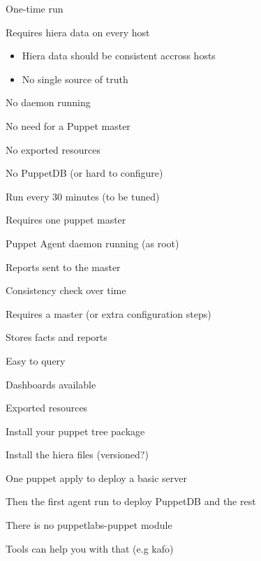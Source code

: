 \begin{iframe}
\item One-time run
\item Requires hiera data on every host
\begin{itemize}
    \item Hiera data should be consistent accross hosts
    \item No single source of truth
\end{itemize}
\item No daemon running
\item No need for a Puppet master
\item No exported resources
\item No PuppetDB (or hard to configure)
\end{iframe}
\begin{iframe}
\item Run every 30 minutes (to be tuned)
\item Requires one puppet master
\item Puppet Agent daemon running (as root)
\item Reports sent to the master
\item Consistency check over time
\end{iframe}

\begin{iframe}[PuppetDB]
\item Requires a master (or extra configuration steps)
\item Stores facts and reports
\item Easy to query
\item Dashboards available
\item Exported resources
\end{iframe}

\begin{iframe}
\item Install your puppet tree package
\item Install the hiera files (versioned?)
\item One puppet apply to deploy a basic server
\item Then the first agent run to deploy PuppetDB and the rest
\item There is no puppetlabs-puppet module
\item Tools can help you with that (e.g kafo)
\end{iframe}


